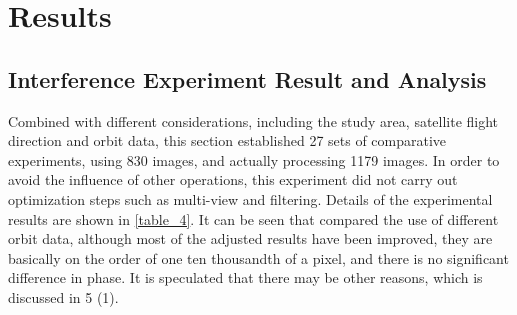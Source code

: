 \documentclass[preprint, authoryear]{elsarticle}
\begin{document}
\section{Results}


\subsection{Interference Experiment Result and Analysis}

Combined with different considerations, including the study area, satellite flight direction and orbit data, this section established 27 sets of comparative experiments, using 830 images, and actually processing 1179 images. In order to avoid the influence of other operations, this experiment did not carry out optimization steps such as multi-view and filtering. Details of the experimental results are shown in \ref{table_4}. It can be seen that compared the use of different orbit data, although most of the adjusted results have been improved, they are basically on the order of one ten thousandth of a pixel, and there is no significant difference in phase. It is speculated that there may be other reasons, which is discussed in 5 (1). \par
\end{document}
